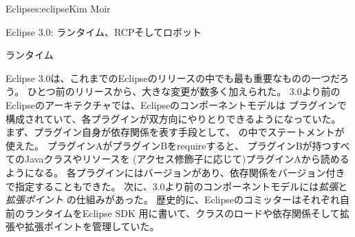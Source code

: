 \begin{aosachapter}{Eclipse}{s:eclipse}{Kim Moir}
\begin{aosasect1}{Eclipse 3.0: ランタイム、RCPそしてロボット}

\begin{aosasect2}{ランタイム}

Eclipse 3.0は、これまでのEclipseのリリースの中でも最も重要なものの一つだろう。
ひとつ前のリリースから、大きな変更が数多く加えられた。
3.0より前のEclipseのアーキテクチャでは、Eclipseのコンポーネントモデルは
プラグインで構成されていて、各プラグインが双方向にやりとりできるようになっていた。
まず、プラグイン自身が依存関係を表す手段として、
の中でステートメントが使えた。
プラグインAがプラグインBをrequireすると、
プラグインBが持つすべてのJavaクラスやリソースを
(アクセス修飾子に応じて)プラグインAから読めるようになる。
各プラグインにはバージョンがあり、依存関係をバージョン付きで指定することもできた。
次に、3.0より前のコンポーネントモデルには\emph{拡張}と\emph{拡張ポイント}
の仕組みがあった。
歴史的に、Eclipseのコミッターはそれぞれ自前のランタイムをEclipse SDK
用に書いて、クラスのロードや依存関係そして拡張や拡張ポイントを管理していた。


\end{aosasect2}
\end{aosasect1}
\end{aosachapter}
